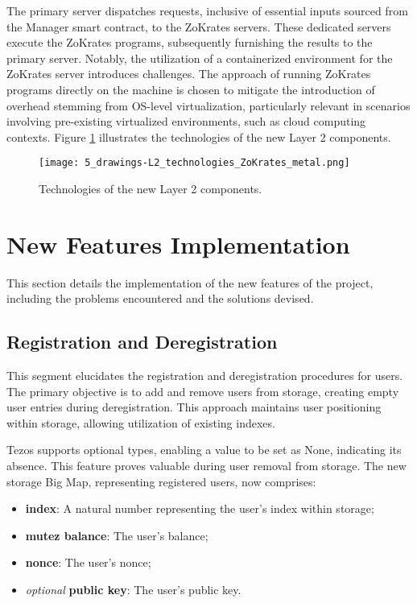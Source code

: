The primary server dispatches requests, inclusive of essential inputs sourced from the Manager smart contract, to the ZoKrates servers. These dedicated servers execute the ZoKrates programs, subsequently furnishing the results to the primary server. Notably, the utilization of a containerized environment for the ZoKrates server introduces challenges. The approach of running ZoKrates programs directly on the machine is chosen to mitigate the introduction of overhead stemming from OS-level virtualization, particularly relevant in scenarios involving pre-existing virtualized environments, such as cloud computing contexts. Figure \ref{fig:5_drawings-L2_technologies_ZoKrates_metal} illustrates the technologies of the new Layer 2 components.

\begin{figure}[ht]
	\centering
	\texttt{[image: 5\_drawings-L2\_technologies\_ZoKrates\_metal.png]}
	\caption[Scaling Solutions]{Technologies of the new Layer 2 components.}  
	\label{fig:5_drawings-L2_technologies_ZoKrates_metal}
  \end{figure} 


\section{New Features Implementation}
This section details the implementation of the new features of the project, including the problems encountered and the solutions devised.

\subsection{Registration and Deregistration}

This segment elucidates the registration and deregistration procedures for users. The primary objective is to add and remove users from storage, creating empty user entries during deregistration. This approach maintains user positioning within storage, allowing utilization of existing indexes.

Tezos supports optional types, enabling a value to be set as None, indicating its absence. This feature proves valuable during user removal from storage. The new storage Big Map, representing registered users, now comprises:
\begin{itemize}
	\item \textbf{index}: A natural number representing the user's index within storage;
	\item \textbf{mutez balance}: The user's balance;
	\item \textbf{nonce}: The user's nonce;
	\item \textit{optional} \textbf{public key}: The user's public key.
\end{itemize}

